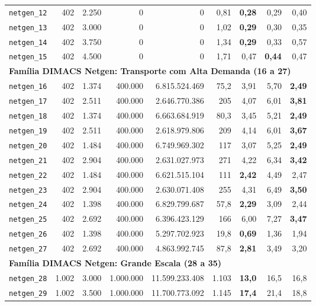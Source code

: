 \begin{longtable}{lrrrrrrrr}
\texttt{netgen\_12} & 402 & 2.250 & 0 & 0 & 0,81 & \textbf{0,28} & 0,29 & 0,40 \\
\texttt{netgen\_13} & 402 & 3.000 & 0 & 0 & 1,02 & \textbf{0,29} & 0,30 & 0,35 \\
\texttt{netgen\_14} & 402 & 3.750 & 0 & 0 & 1,34 & \textbf{0,29} & 0,33 & 0,57 \\
\texttt{netgen\_15} & 402 & 4.500 & 0 & 0 & 1,71 & 0,47 & \textbf{0,44} & 0,47 \\
\midrule
\multicolumn{9}{l}{\textbf{Família DIMACS Netgen: Transporte com Alta Demanda (16 a 27)}} \\
\midrule
\texttt{netgen\_16} & 402 & 1.374 & 400.000 & 6.815.524.469 & 75,2 & 3,91 & 5,70 & \textbf{2,49} \\
\texttt{netgen\_17} & 402 & 2.511 & 400.000 & 2.646.770.386 & 205 & 4,07 & 6,01 & \textbf{3,81} \\
\texttt{netgen\_18} & 402 & 1.374 & 400.000 & 6.663.684.919 & 80,3 & 3,45 & 5,21 & \textbf{2,49} \\
\texttt{netgen\_19} & 402 & 2.511 & 400.000 & 2.618.979.806 & 209 & 4,14 & 6,01 & \textbf{3,67} \\
\texttt{netgen\_20} & 402 & 1.484 & 400.000 & 6.749.969.302 & 117 & 3,07 & 5,25 & \textbf{2,49} \\
\texttt{netgen\_21} & 402 & 2.904 & 400.000 & 2.631.027.973 & 271 & 4,22 & 6,34 & \textbf{3,42} \\
\texttt{netgen\_22} & 402 & 1.484 & 400.000 & 6.621.515.104 & 111 & \textbf{2,42} & 4,49 & 2,47 \\
\texttt{netgen\_23} & 402 & 2.904 & 400.000 & 2.630.071.408 & 255 & 4,31 & 6,49 & \textbf{3,50} \\
\texttt{netgen\_24} & 402 & 1.398 & 400.000 & 6.829.799.687 & 57,8 & \textbf{2,29} & 3,09 & 2,44 \\
\texttt{netgen\_25} & 402 & 2.692 & 400.000 & 6.396.423.129 & 166 & 6,00 & 7,27 & \textbf{3,47} \\
\texttt{netgen\_26} & 402 & 1.398 & 400.000 & 5.297.702.923 & 19,8 & \textbf{0,69} & 1,36 & 1,94 \\
\texttt{netgen\_27} & 402 & 2.692 & 400.000 & 4.863.992.745 & 87,8 & \textbf{2,81} & 3,49 & 3,20 \\
\midrule
\multicolumn{9}{l}{\textbf{Família DIMACS Netgen: Grande Escala (28 a 35)}} \\
\midrule
\texttt{netgen\_28} & 1.002 & 3.000 & 1.000.000 & 11.599.233.408 & 1.103 & \textbf{13,0} & 16,5 & 16,8 \\
\texttt{netgen\_29} & 1.002 & 3.500 & 1.000.000 & 11.700.773.092 & 1.145 & \textbf{17,4} & 21,4 & 18,8 \\

\end{longtable}
